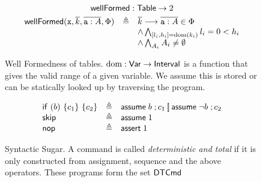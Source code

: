 \begin{figure}[tp]
  \[\mathsf{wellFormed} : \mathsf{Table} \to 2\]
  \[\begin{array}{rcl}
      \mathsf{wellFormed}(\texttt{x},\overline{k},\overline{\texttt{a} : A}, \Phi)
      &\triangleq
      & \overline{k} \longrightarrow \overline{\texttt{a} : A} \in \Phi\\
      && \wedge \bigwedge_{[l_i,h_i] = \mathrm{dom}(k_i)} l_i = 0 < h_i \\
      && \wedge \bigwedge_{A_i} A_i \neq \emptyset
    \end{array}\]
  \caption{Well Formedness of tables. $\mathrm{dom}:\mathsf{Var} \to \mathsf{Interval}$ is a
    function that gives the valid range of a given variable. We assume
    this is stored or can be statically looked up by traversing the
    program. }
  \label{ref:well-formed}
\end{figure}
\begin{figure}[ht]
  \[\begin{array}{lcl}
      \mathsf{if}~(b)~\{c_1\}~\{c_2\} & \triangleq & \mathsf{assume}\; b\;;c_1 \operatorname*{\left[\!\right]} \mathsf{assume}\; \neg b\;; c_2 \\
      \mathsf{skip} & \triangleq& \mathsf{assume}\; 1\; \\
      \mathsf{nop} & \triangleq & \mathsf{assert}\; 1\;
    \end{array}
  \]
  \caption{Syntactic Sugar. A command is called \emph{deterministic
      and total} if it is only constructed from assignment, sequence
    and the above operators. These programs form the set $\mathsf{DTCmd}$}
  \label{fig:sugar}
\end{figure}



